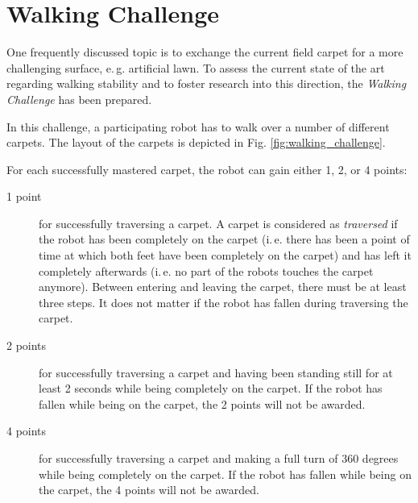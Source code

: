 \documentclass[12pt]{article}
\newcommand{\ie}{\mbox{i.\,e.}\xspace}
\newcommand{\eg}{\mbox{e.\,g.}\xspace}
\begin{document}
\newpage






\section{Walking Challenge}

One frequently discussed topic is to exchange the current field carpet for a more challenging surface, \eg artificial lawn.
To assess the current state of the art regarding walking stability and to foster research into this direction, the \textit{Walking Challenge} has been prepared.

In this challenge, a participating robot has to walk over a number of different carpets. The layout of the carpets is depicted in Fig. \ref{fig:walking_challenge}.

For each successfully mastered carpet, the robot can gain either 1, 2, or 4 points: 

\begin{description}
\item[1 point] for successfully traversing a carpet. A carpet is considered as \textit{traversed} if the robot has been completely on the carpet (\ie there has been a point of time at which both feet have been completely on the carpet) and has left it completely afterwards (\ie no part of the robots touches the carpet anymore). Between entering and leaving the carpet, there must be at least three steps. It does not matter if the robot has fallen during traversing the carpet.
\item[2 points] for successfully traversing a carpet and having been standing still for at least 2 seconds while being completely on the carpet. If the robot has fallen while being on the carpet, the 2 points will not be awarded.
\item[4 points] for successfully traversing a carpet and making a full turn of 360 degrees while being completely on the carpet. If the robot has fallen while being on the carpet, the 4 points will not be awarded.
\end{description}
\end{document}
